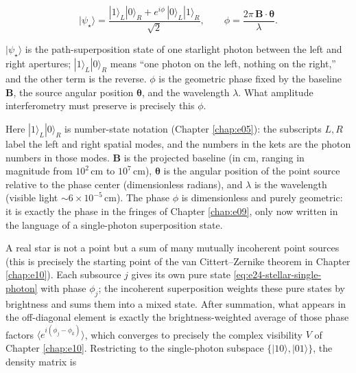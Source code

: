 \begin{equation}
  |\psi_\star\rangle
  =
  \frac{|1\rangle_L|0\rangle_R
  +
  e^{i\phi}\,|0\rangle_L|1\rangle_R}{\sqrt2},
  \qquad
  \phi=\frac{2\pi\,\bm{B}\cdot\bm{\theta}}{\lambda}.
  \label{eq:e24-stellar-single-photon}
\end{equation}
\begin{formulaexplain}
\(|\psi_\star\rangle\) is the path-superposition state of one starlight photon between the left and right apertures; \(|1\rangle_L|0\rangle_R\) means ``one photon on the left, nothing on the right,'' and the other term is the reverse. \(\phi\) is the geometric phase fixed by the baseline \(\bm{B}\), the source angular position \(\bm{\theta}\), and the wavelength \(\lambda\). What amplitude interferometry must preserve is precisely this \(\phi\).
\end{formulaexplain}

Here \(|1\rangle_L|0\rangle_R\) is number-state notation (Chapter \ref{chap:e05}): the subscripts \(L,R\) label the left and right spatial modes, and the numbers in the kets are the photon numbers in those modes. \(\bm{B}\) is the projected baseline (in cm, ranging in magnitude from \(10^2\,\mathrm{cm}\) to \(10^7\,\mathrm{cm}\)), \(\bm{\theta}\) is the angular position of the point source relative to the phase center (dimensionless radians), and \(\lambda\) is the wavelength (visible light \(\sim6\times10^{-5}\,\mathrm{cm}\)). The phase \(\phi\) is dimensionless and purely geometric: it is exactly the phase in the fringes of Chapter \ref{chap:e09}, only now written in the language of a single-photon superposition state.

A real star is not a point but a sum of many mutually incoherent point sources (this is precisely the starting point of the van Cittert--Zernike theorem in Chapter \ref{chap:e10}). Each subsource \(j\) gives its own pure state \eqref{eq:e24-stellar-single-photon} with phase \(\phi_j\); the incoherent superposition weights these pure states by brightness and sums them into a mixed state. After summation, what appears in the off-diagonal element is exactly the brightness-weighted average of those phase factors \(\langle e^{i(\phi_j-\phi_k)}\rangle\), which converges to precisely the complex visibility \(V\) of Chapter \ref{chap:e10}. Restricting to the single-photon subspace \(\{|10\rangle,|01\rangle\}\), the density matrix is

